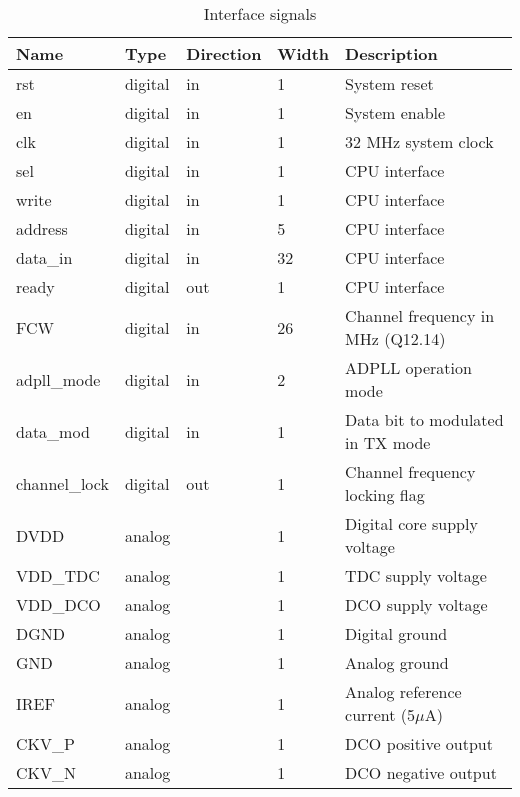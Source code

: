 \begin{table}[!h]
  \centering
    \begin{tabular}{|p{3cm}|p{1.5cm}|p{2cm}|p{1.5cm}|p{7cm}|}
      \hline
      \rowcolor{tab-green}
    {\bf Name} & {\bf Type} & {\bf Direction} & {\bf Width} & {\bf Description} \\
    \hline \hline 
    rst & digital & in & 1 & System reset\\
    \hline
    en & digital & in & 1 & System enable \\
    \hline
    clk &  digital & in & 1 & 32 MHz system clock \\
    \hline
    sel &  digital & in & 1 & CPU interface \\
    \hline
    write &  digital & in & 1 & CPU interface \\
    \hline
    address &  digital & in & 5 & CPU interface \\
    \hline
    data\_in &  digital & in & 32 & CPU interface \\
    \hline
    ready &  digital & out & 1 & CPU interface \\
    \hline
    FCW &  digital & in &  26 & Channel frequency in MHz (Q12.14) \\
    \hline
    adpll\_mode & digital & in & 2 & ADPLL operation mode \\
    \hline
    data\_mod & digital & in & 1 & Data bit to modulated in TX mode\\
    \hline
    channel\_lock & digital & out & 1 & Channel frequency locking flag \\
    \hline
    DVDD & analog &  & 1 & Digital core supply voltage \\
    \hline
    VDD\_TDC & analog &   & 1 & TDC supply voltage \\
    \hline
    VDD\_DCO & analog &  & 1 & DCO supply voltage \\
    \hline
    DGND & analog &    & 1 & Digital ground \\
    \hline
    GND & analog &    & 1 & Analog ground \\
    \hline
    IREF & analog &    & 1 & Analog reference current (5$\mu$A) \\
    \hline
    CKV\_P & analog &    & 1 & DCO positive output \\
    \hline
    CKV\_N & analog &    & 1 & DCO negative output \\
    \hline
    
    \end{tabular}
  \caption{Interface signals}
  \label{tab:adpll_interface}
\end{table}


